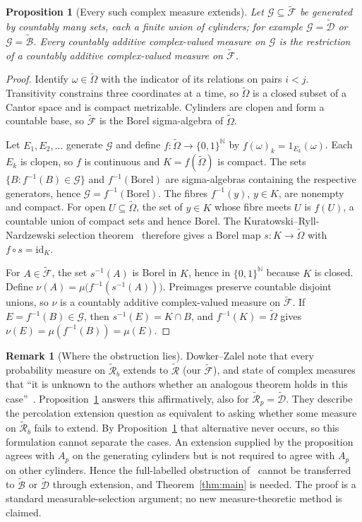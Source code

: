 \documentclass[11pt]{article}
\newtheorem{proposition}[theorem]{Proposition}
\theoremstyle{definition}
\newtheorem{remark}[theorem]{Remark}
\newcommand{\Om}{\widetilde\Omega}
\newcommand{\F}{\widetilde{\mathcal F}}
\newcommand{\D}{\widetilde{\mathcal D}}
\newcommand{\Bt}{\widetilde{\mathcal B}}
\begin{document}
\begin{proposition}[Every such complex measure extends]\label{prop:extend}
Let $\mathcal G\subseteq\F$ be generated by countably many sets, each a
finite union of cylinders; for example $\mathcal G=\D$ or $\mathcal G=\Bt$.
Every countably additive complex-valued measure on $\mathcal G$ is the
restriction of a countably additive complex-valued measure on $\F$.
\end{proposition}
\begin{proof}
Identify $\omega\in\Om$ with the indicator of its relations on pairs $i<j$.
Transitivity constrains three coordinates at a time, so $\Om$ is a closed
subset of a Cantor space and is compact metrizable. Cylinders are clopen
and form a countable base, so $\F$ is the Borel sigma-algebra of $\Om$.

Let $E_1,E_2,\ldots$ generate $\mathcal G$ and define
$f:\Om\to\{0,1\}^{\mathbb N}$ by $f(\omega)_k=1_{E_k}(\omega)$. Each $E_k$
is clopen, so $f$ is continuous and $K=f(\Om)$ is compact. The sets
$\{B: f^{-1}(B)\in\mathcal G\}$ and $f^{-1}(\text{Borel})$ are
sigma-algebras containing the respective generators, hence
$\mathcal G=f^{-1}(\text{Borel})$. The fibres $f^{-1}(y)$, $y\in K$, are
nonempty and compact. For open $U\subseteq\Om$, the set of $y\in K$ whose
fibre meets $U$ is $f(U)$, a countable union of compact sets and hence
Borel. The Kuratowski--Ryll-Nardzewski selection theorem~\cite{KRN} therefore
gives a Borel map $s:K\to\Om$ with $f\circ s=\mathrm{id}_K$.

For $A\in\F$, the set $s^{-1}(A)$ is Borel in $K$, hence in
$\{0,1\}^{\mathbb N}$ because $K$ is closed. Define
$\nu(A)=\mu\bigl(f^{-1}(s^{-1}(A))\bigr)$. Preimages preserve countable
disjoint unions, so $\nu$ is a countably additive complex-valued measure on
$\F$. If $E=f^{-1}(B)\in\mathcal G$, then $s^{-1}(E)=K\cap B$, and
$f^{-1}(K)=\Om$ gives $\nu(E)=\mu(f^{-1}(B))=\mu(E)$.
\end{proof}

\begin{remark}[Where the obstruction lies]\label{rem:where}
Dowker--Zalel note that every probability measure on
$\widetilde{\mathcal R}_b$ extends to $\widetilde{\mathcal R}$ (our $\F$),
and state of complex measures that ``it is unknown to the authors whether an
analogous theorem holds in this case''~\cite[Sec.~III.4]{DZ}.
Proposition~\ref{prop:extend} answers this affirmatively, also for
$\widetilde{\mathcal R}_p=\D$. They describe the percolation extension
question as equivalent to asking whether some measure on
$\widetilde{\mathcal R}_b$ fails to extend. By
Proposition~\ref{prop:extend} that alternative never occurs, so this
formulation cannot separate the cases. An extension supplied by the
proposition agrees with $A_p$ on the generating cylinders but is not required
to agree with $A_p$ on other cylinders. Hence the full-labelled obstruction
of~\cite{DJS} cannot be transferred to $\Bt$ or $\D$ through extension, and
Theorem~\ref{thm:main} is needed. The proof is a standard measurable-selection
argument; no new measure-theoretic method is claimed.
\end{remark}
\end{document}
